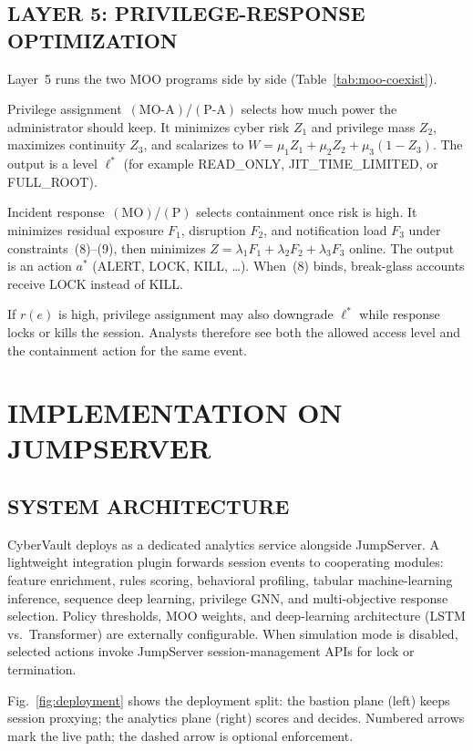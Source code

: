 \documentclass{ieeeaccess}
\begin{document}
\subsection{LAYER 5: PRIVILEGE-RESPONSE OPTIMIZATION}
Layer~5 runs the two MOO programs side by side (Table~\ref{tab:moo-coexist}).

Privilege assignment~$(\mathrm{MO}\text{-}\mathrm{A})$/$(\mathrm{P}\text{-}\mathrm{A})$ selects how much power the administrator should keep. It minimizes cyber risk $Z_1$ and privilege mass $Z_2$, maximizes continuity $Z_3$, and scalarizes to $W=\mu_1 Z_1+\mu_2 Z_2+\mu_3(1-Z_3)$. The output is a level $\ell^*$ (for example READ\_ONLY, JIT\_TIME\_LIMITED, or FULL\_ROOT).

Incident response~$(\mathrm{MO})$/$(\mathrm{P})$ selects containment once risk is high. It minimizes residual exposure $F_1$, disruption $F_2$, and notification load $F_3$ under constraints~(8)--(9), then minimizes $Z=\lambda_1 F_1+\lambda_2 F_2+\lambda_3 F_3$ online. The output is an action $a^*$ (ALERT, LOCK, KILL, \ldots). When~(8) binds, break-glass accounts receive LOCK instead of KILL.

If $r(e)$ is high, privilege assignment may also downgrade $\ell^*$ while response locks or kills the session. Analysts therefore see both the allowed access level and the containment action for the same event.

\section{IMPLEMENTATION ON JUMPSERVER}
\label{sec:implementation}

\subsection{SYSTEM ARCHITECTURE}
CyberVault deploys as a dedicated analytics service alongside JumpServer. A lightweight integration plugin forwards session events to cooperating modules: feature enrichment, rules scoring, behavioral profiling, tabular machine-learning inference, sequence deep learning, privilege GNN, and multi-objective response selection. Policy thresholds, MOO weights, and deep-learning architecture (LSTM vs.\ Transformer) are externally configurable. When simulation mode is disabled, selected actions invoke JumpServer session-management APIs for lock or termination.

Fig.~\ref{fig:deployment} shows the deployment split: the bastion plane (left) keeps session proxying; the analytics plane (right) scores and decides. Numbered arrows mark the live path; the dashed arrow is optional enforcement.
\end{document}
